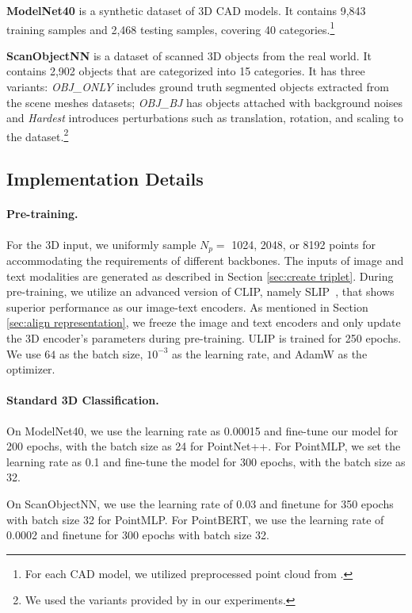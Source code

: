 \noindent\textbf{ModelNet40} is a synthetic dataset of 3D CAD models. It contains 9,843 training samples and 2,468 testing samples, covering 40 categories.\footnote{For each CAD model, we utilized preprocessed point cloud from \cite{ma2022rethinking}.}

\noindent\textbf{ScanObjectNN} is a dataset of scanned 3D objects from the real world.
It contains 2,902 objects that are categorized into 15 categories. It has three variants: \emph{OBJ\_ONLY} includes ground truth segmented objects extracted from the scene meshes datasets; \emph{OBJ\_BJ} has objects attached with background noises and \emph{Hardest} introduces perturbations such as translation, rotation, and scaling to the dataset\cite{Uy_2019_ICCV}.\footnote{We used the variants provided by \cite{yu2022point} in our experiments.}

\subsection{Implementation Details}

\paragraph{Pre-training.} For the 3D input, we uniformly sample $N_p=$ 1024, 2048, or 8192 points for accommodating the requirements of different backbones. The inputs of image and text modalities are generated as described in Section \ref{sec:create triplet}. During pre-training, we utilize an advanced version of CLIP, namely SLIP~\cite{mu2022slip}, that shows superior performance as our image-text encoders. 
As mentioned in Section \ref{sec:align representation}, we freeze the image and text encoders and only update the 3D encoder's parameters during pre-training. 
ULIP is trained for 250 epochs.
We use $64$ as the batch size, $10^{-3}$ as the learning rate, and AdamW as the optimizer. %

\vspace{-10pt}
\paragraph{Standard 3D Classification.} On ModelNet40, we use the learning rate as 0.00015 and fine-tune our model for 200 epochs, with the batch size as 24 for PointNet++. 
For PointMLP, we set the learning rate as 0.1 and fine-tune the model for 300 epochs, with the batch size as 32. 

On ScanObjectNN, we use the learning rate of 0.03 and finetune for 350 epochs with batch size 32 for PointMLP. 
For PointBERT, we use the learning rate of 0.0002 and finetune for 300 epochs with batch size 32.

